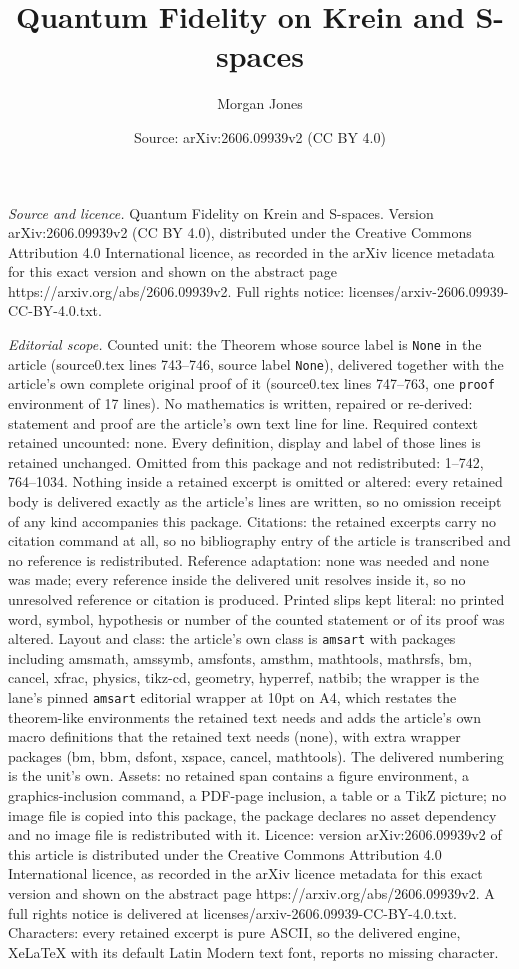 \documentclass[10pt,a4paper]{amsart}
\title[Quantum Fidelity on Krein and S-spaces]{Quantum Fidelity on Krein and S-spaces}
\author{Morgan Jones}
\date{Source: arXiv:2606.09939v2 (CC BY 4.0)}
\begin{document}
\maketitle

\noindent\emph{Source and licence.} Quantum Fidelity on Krein and S-spaces. Version arXiv:2606.09939v2 (CC BY 4.0), distributed under the Creative Commons Attribution 4.0 International licence, as recorded in the arXiv licence metadata for this exact version and shown on the abstract page https://arxiv.org/abs/2606.09939v2. Full rights notice: licenses/arxiv-2606.09939-CC-BY-4.0.txt.\par\smallskip

\noindent\textit{Editorial scope.} Counted unit: the Theorem whose source label is \texttt{None} in the article (source0.tex lines 743--746, source label \texttt{None}), delivered together with the article's own complete original proof of it (source0.tex lines 747--763, one \texttt{proof} environment of 17 lines). No mathematics is written, repaired or re-derived: statement and proof are the article's own text line for line. Required context retained uncounted: none. Every definition, display and label of those lines is retained unchanged. Omitted from this package and not redistributed: 1--742, 764--1034. Nothing inside a retained excerpt is omitted or altered: every retained body is delivered exactly as the article's lines are written, so no omission receipt of any kind accompanies this package. Citations: the retained excerpts carry no citation command at all, so no bibliography entry of the article is transcribed and no reference is redistributed. Reference adaptation: none was needed and none was made; every reference inside the delivered unit resolves inside it, so no unresolved reference or citation is produced. Printed slips kept literal: no printed word, symbol, hypothesis or number of the counted statement or of its proof was altered. Layout and class: the article's own class is \texttt{amsart} with packages including amsmath, amssymb, amsfonts, amsthm, mathtools, mathrsfs, bm, cancel, xfrac, physics, tikz-cd, geometry, hyperref, natbib; the wrapper is the lane's pinned \texttt{amsart} editorial wrapper at 10pt on A4, which restates the theorem-like environments the retained text needs and adds the article's own macro definitions that the retained text needs (none), with extra wrapper packages (bm, bbm, dsfont, xspace, cancel, mathtools). The delivered numbering is the unit's own. Assets: no retained span contains a figure environment, a graphics-inclusion command, a PDF-page inclusion, a table or a TikZ picture; no image file is copied into this package, the package declares no asset dependency and no image file is redistributed with it. Licence: version arXiv:2606.09939v2 of this article is distributed under the Creative Commons Attribution 4.0 International licence, as recorded in the arXiv licence metadata for this exact version and shown on the abstract page https://arxiv.org/abs/2606.09939v2. A full rights notice is delivered at licenses/arxiv-2606.09939-CC-BY-4.0.txt. Characters: every retained excerpt is pure ASCII, so the delivered engine, XeLaTeX with its default Latin Modern text font, reports no missing character.
\end{document}
